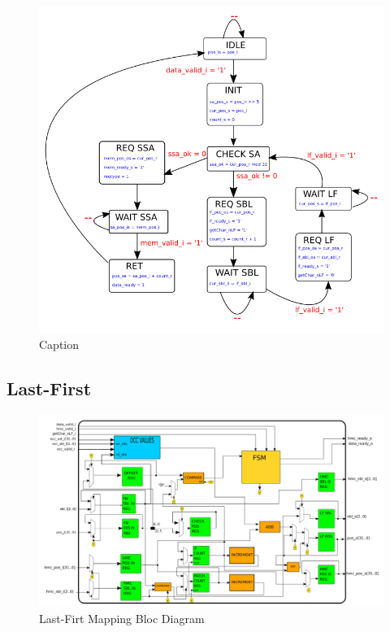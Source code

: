 \begin{minipage}[t]{0.45\textwidth}
\begin{figure}[H]
    \centering
    \hspace*{-20mm}\includegraphics[scale = 0.45]{Figures/WL_FSM.png}
    \caption{Caption}
    \label{fig:wl_fsm}
\end{figure}
\end{minipage}
\hfill
\begin{minipage}[t]{0.3\textwidth}

\end{minipage}
\vspace*{8mm}


\subsection{Last-First}

\begin{figure}[H]
    \centering
   \includegraphics[scale = 0.4]{Figures/LF_DIAG.png}
    \caption{Last-Firt Mapping Bloc Diagram}
    \label{fig:bounds_diag}
\end{figure}


